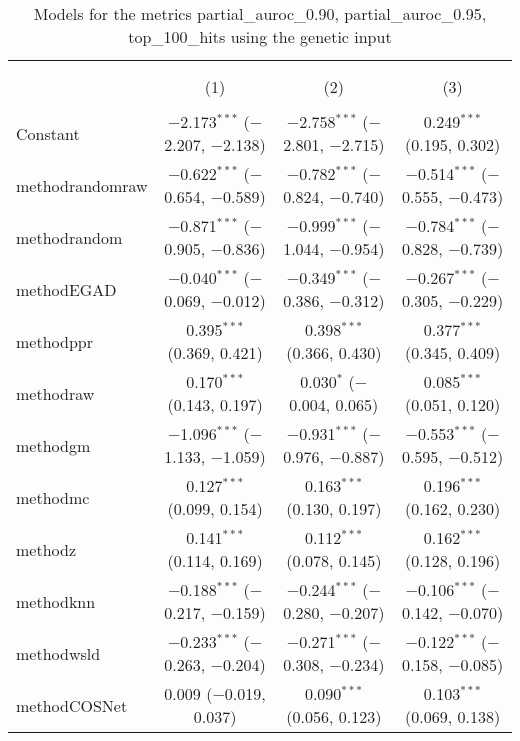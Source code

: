 
\begin{table}[!htbp] \centering 
  \caption{Models for the metrics partial_auroc_0.90, partial_auroc_0.95, top_100_hits using the genetic input} 
  \label{} 
\begin{tabular}{@{\extracolsep{5pt}}lccc} 
\\[-1.8ex]\hline 
\hline \\[-1.8ex] 
\\[-1.8ex] & (1) & (2) & (3)\\ 
\hline \\[-1.8ex] 
 Constant & $-$2.173$^{***}$ ($-$2.207, $-$2.138) & $-$2.758$^{***}$ ($-$2.801, $-$2.715) & 0.249$^{***}$ (0.195, 0.302) \\ 
  methodrandomraw & $-$0.622$^{***}$ ($-$0.654, $-$0.589) & $-$0.782$^{***}$ ($-$0.824, $-$0.740) & $-$0.514$^{***}$ ($-$0.555, $-$0.473) \\ 
  methodrandom & $-$0.871$^{***}$ ($-$0.905, $-$0.836) & $-$0.999$^{***}$ ($-$1.044, $-$0.954) & $-$0.784$^{***}$ ($-$0.828, $-$0.739) \\ 
  methodEGAD & $-$0.040$^{***}$ ($-$0.069, $-$0.012) & $-$0.349$^{***}$ ($-$0.386, $-$0.312) & $-$0.267$^{***}$ ($-$0.305, $-$0.229) \\ 
  methodppr & 0.395$^{***}$ (0.369, 0.421) & 0.398$^{***}$ (0.366, 0.430) & 0.377$^{***}$ (0.345, 0.409) \\ 
  methodraw & 0.170$^{***}$ (0.143, 0.197) & 0.030$^{*}$ ($-$0.004, 0.065) & 0.085$^{***}$ (0.051, 0.120) \\ 
  methodgm & $-$1.096$^{***}$ ($-$1.133, $-$1.059) & $-$0.931$^{***}$ ($-$0.976, $-$0.887) & $-$0.553$^{***}$ ($-$0.595, $-$0.512) \\ 
  methodmc & 0.127$^{***}$ (0.099, 0.154) & 0.163$^{***}$ (0.130, 0.197) & 0.196$^{***}$ (0.162, 0.230) \\ 
  methodz & 0.141$^{***}$ (0.114, 0.169) & 0.112$^{***}$ (0.078, 0.145) & 0.162$^{***}$ (0.128, 0.196) \\ 
  methodknn & $-$0.188$^{***}$ ($-$0.217, $-$0.159) & $-$0.244$^{***}$ ($-$0.280, $-$0.207) & $-$0.106$^{***}$ ($-$0.142, $-$0.070) \\ 
  methodwsld & $-$0.233$^{***}$ ($-$0.263, $-$0.204) & $-$0.271$^{***}$ ($-$0.308, $-$0.234) & $-$0.122$^{***}$ ($-$0.158, $-$0.085) \\ 
  methodCOSNet & 0.009 ($-$0.019, 0.037) & 0.090$^{***}$ (0.056, 0.123) & 0.103$^{***}$ (0.069, 0.138) \\ 

\end{tabular}
\end{table}
